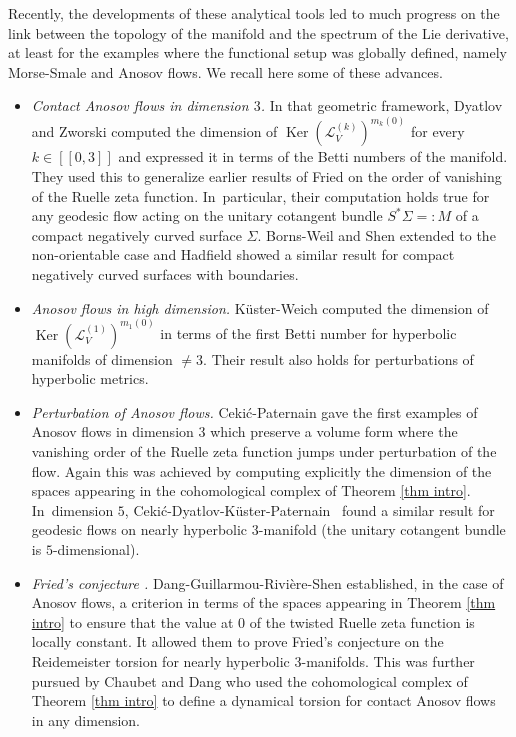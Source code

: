 \documentclass[JEP,XML,SOM,Unicode,NoEqCountersInSection,NoFloatCountersInSection,published]{cedram}
\newcommand{\lcr}{[\![}
\newcommand{\rcr}{]\!]}
\theoremstyle{definition}
\theoremstyle{plain}
\newcommand{\Lie}{\mathcal{L}}
\DeclareMathOperator{\Ker}{Ker}
\begin{document}
Recently, the developments of these analytical tools led to much progress on the link between the topology of the manifold and the spectrum of the Lie derivative, at least for the examples where the functional setup was globally defined, namely Morse-Smale and Anosov flows. We recall here some of these advances.
\begin{itemize}
\item \emph{Contact Anosov flows in dimension $3$.} In that geometric framework, Dyatlov and Zworski \cite{dyatlov-zworski_2017} computed the dimension of $\Ker (\Lie_V^{(k)})^{m_k(0)}$ for every $k\in\lcr0,3\rcr$ and expressed it in terms of the Betti numbers of the manifold. They used this to generalize earlier results of Fried \cite{fried_lefschetz} on the order of vanishing of the Ruelle zeta function. In~particular, their computation holds true for any geodesic flow acting on the unitary cotangent bundle $S^*\Sigma =: M$ of a compact negatively curved surface $\Sigma$. Borns-Weil and Shen \cite{borns-weil-shen} extended \cite{dyatlov-zworski_2017} to the non-orientable case and Hadfield \cite{hadfield} showed a similar result for compact negatively curved surfaces with boundaries.
\item \emph{Anosov flows in high dimension.} Küster-Weich \cite{kuster-weich} computed the dimension of $\Ker (\Lie_V^{(1)})^{m_1(0)}$ in terms of the first Betti number for hyperbolic manifolds of dimension $\neq 3$. Their result also holds for perturbations of hyperbolic metrics.
\item \emph{Perturbation of Anosov flows.} Ceki\'{c}-Paternain \cite{cekic-paternain} gave the first examples of Anosov flows in dimension $3$ which preserve a volume form where the vanishing order of the Ruelle zeta function jumps under perturbation of the flow. Again this was achieved by computing explicitly the dimension of the spaces appearing in the cohomological complex of Theorem \ref{thm intro}. In~dimension $5$, Ceki\'{c}-Dyatlov-Küster-Paternain~\cite{CDKP} found a similar result for geodesic flows on nearly hyperbolic $3$-manifold (the unitary cotangent bundle is $5$-dimensional).
\item \emph{Fried's conjecture \cite{fried_lefschetz,fried_meromorphic}.} Dang-Guillarmou-Rivière-Shen \cite{DGRS} established, in the case of Anosov flows, a criterion in terms of the spaces appearing in Theorem \ref{thm intro} to ensure that the value at $0$ of the twisted Ruelle zeta function is locally constant. It allowed them to prove Fried's conjecture on the Reidemeister torsion for nearly hyperbolic $3$-manifolds. This was further pursued by Chaubet and Dang \cite{chaubet-dang} who used the cohomological complex of Theorem \ref{thm intro} to define a dynamical torsion for contact Anosov flows in any dimension.

\end{itemize}
\end{document}
